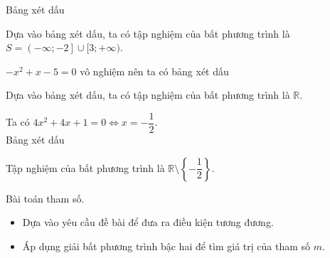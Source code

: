\begin{vd}
{\begin{listEX}
			Bảng xét dấu
			\begin{center}
			\end{center}
			Dựa vào bảng xét dấu, ta có tập nghiệm của bất phương trình là $S=\left(-\infty;-2\right]\cup [3;+\infty)$.
			\item $-x^2+x-5=0$ vô nghiệm nên ta có bảng xét dấu
			\begin{center}
			\end{center}
			Dựa vào bảng xét dấu, ta có tập nghiệm của bất phương trình là $\mathbb{R}$.
			\item Ta có $4x^2+4x+1=0\Leftrightarrow x=-\dfrac{1}{2} $.\\
			Bảng xét dấu
			\begin{center}
			\end{center}
			Tập nghiệm của bất phương trình là $\mathbb{R}\setminus\left\{-\dfrac{1}{2}\right\}$.
			
		\end{listEX}
	}
\end{vd}

\begin{dang}{Bài toán tham số.}
	\begin{itemize}
		\item [$\bullet$] Dựa vào yêu cầu đề bài để đưa ra điều kiện tương đương.
		\item [$\bullet$] Áp dụng giải bất phương trình bậc hai để tìm giá trị của tham số $m$.
	\end{itemize}
\end{dang}

